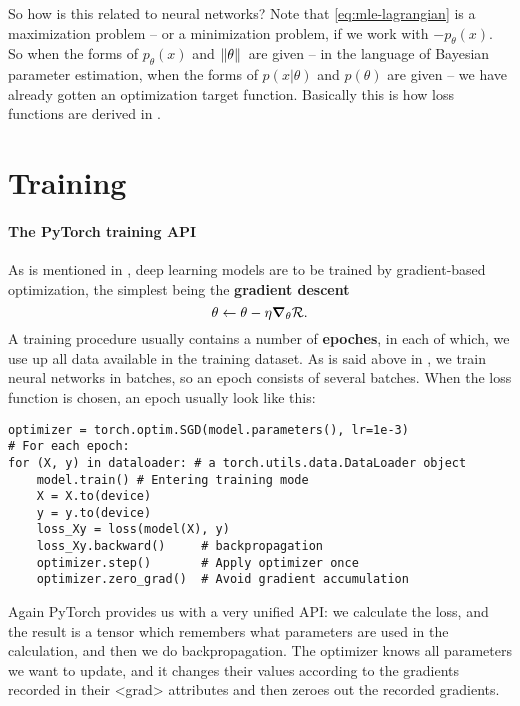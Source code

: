 \documentclass[hyperref, a4paper, 12pt]{report}
\newcommand*{\concept}[1]{{\textbf{#1}}}
\def\texttt#1{<#1>}%
\newcommand{\shortcode}[1]{\texttt{#1}}
\begin{document}
So how is this related to neural networks?
Note that \eqref{eq:mle-lagrangian} is a maximization problem -- or a minimization problem,
if we work with $- p_\theta(x)$.
So when the forms of $p_\theta(x)$ and $\norm*{\theta}$ are given 
-- in the language of Bayesian parameter estimation, when the forms of $p(x | \theta)$ and $p(\theta)$ are given --
we have already gotten an optimization target function.
Basically this is how loss functions are derived in .

\section{Training}

\paragraph*{The PyTorch training API}
As is mentioned in , deep learning models are to be trained by gradient-based optimization,
the simplest being the \concept{gradient descent}
\begin{equation}
    \theta \leftarrow \theta - \eta \grad_\theta \mathcal{R}.
\end{equation}
A training procedure usually contains a number of \concept{epoches},
in each of which, we use up all data available in the training dataset.
As is said above in , 
we train neural networks in batches, so an epoch consists of several batches.
When the loss function is chosen, 
an epoch usually look like this:

\begin{lstlisting}
optimizer = torch.optim.SGD(model.parameters(), lr=1e-3)
# For each epoch:
for (X, y) in dataloader: # a torch.utils.data.DataLoader object
    model.train() # Entering training mode 
    X = X.to(device)
    y = y.to(device)
    loss_Xy = loss(model(X), y)
    loss_Xy.backward()     # backpropagation
    optimizer.step()       # Apply optimizer once 
    optimizer.zero_grad()  # Avoid gradient accumulation
\end{lstlisting}

Again PyTorch provides us with a very unified API:
we calculate the loss, and the result is a tensor which remembers what parameters are used in the calculation,
and then we do backpropagation.
The optimizer knows all parameters we want to update,
and it changes their values according to the gradients recorded in their \shortcode{grad} attributes
and then zeroes out the recorded gradients.
\end{document}
